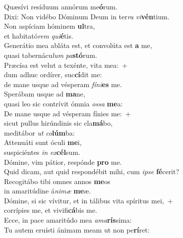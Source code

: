 \evenverse Quæsívi resíduum annórum me\textbf{ó}rum.~\*\\
\evenverse Dixi: Non vidébo Dóminum Deum in ter\textit{ra} \textit{vi}\textbf{vén}tium.\\
\oddverse Non aspíciam hóminem \textbf{ul}tra,~\*\\
\oddverse et habitató\textit{rem} \textit{qui}\textbf{é}tis.\\
\evenverse Generátio mea abláta est, et convolúta est \textbf{a} me,~\*\\
\evenverse quasi tabernácu\textit{lum} \textit{pa}\textbf{stó}rum.\\
\oddverse Præcísa est velut a texénte, vita mea:~+\\
\oddverse  dum adhuc ordírer, suc\textbf{cí}dit me:~\*\\
\oddverse de mane usque ad vésperam \textit{fí}\textit{ni}\textbf{es} me.\\
\evenverse Sperábam usque ad \textbf{ma}ne,~\*\\
\evenverse quasi leo sic contrívit ómnia \textit{os}\textit{sa} \textbf{me}a:\\
\oddverse De mane usque ad vésperam fínies me:~+\\
\oddverse  sicut pullus hirúndinis sic cla\textbf{má}bo,~\*\\
\oddverse meditábor \textit{ut} \textit{co}\textbf{lúm}ba:\\
\evenverse Attenuáti sunt óculi \textbf{me}i,~\*\\
\evenverse suspiciéntes \textit{in} \textit{ex}\textbf{cél}sum.\\
\oddverse Dómine, vim pátior, respónde \textbf{pro} me.~\*\\
\oddverse Quid dicam, aut quid respondébit mihi, cum \textit{i}\textit{pse} \textbf{fé}cerit?\\
\evenverse Recogitábo tibi omnes annos \textbf{me}os~\*\\
\evenverse in amaritúdine á\textit{ni}\textit{mæ} \textbf{me}æ.\\
\oddverse Dómine, si sic vívitur, et in tálibus vita spíritus mei,~+\\
\oddverse  corrípies me, et vivifi\textbf{cá}bis me.~\*\\
\oddverse Ecce, in pace amaritúdo mea \textit{a}\textit{ma}\textbf{rís}sima:\\
\evenverse Tu autem eruísti ánimam meam ut non pe\textbf{rí}ret:~\*\\
